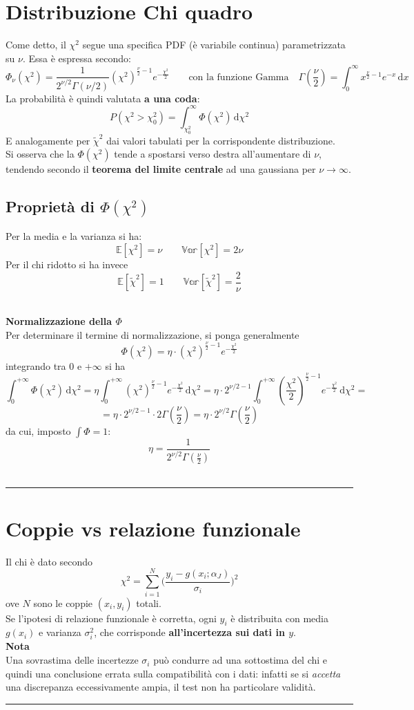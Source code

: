 \documentclass[10pt, oneside]{book}
\newcommand{\infobox}[2]{\vspace{0.5cm}~\\ \textbf{#1} \hrulefill \vspace{0.2cm}\\#2 {}\,\\\hrule \vspace{0.5cm}}
\newcommand{\integral}[4]{\int_{#1}^{#2} #3 \, \mathrm{d}#4}
\begin{document}
\section{Distribuzione Chi quadro}
Come detto, il $\chi^2$ segue una specifica PDF (è variabile continua) parametrizzata su $\nu$. Essa è espressa secondo:
\[\Phi_\nu(\chi^2) = \frac{1}{2^{\nu/2} \Gamma(\nu/2)} (\chi^2)^{\displaystyle \frac{\nu}{2} - 1} e^{\displaystyle - \frac{\chi^2}{2}} \qquad \textrm{con la funzione Gamma} \quad \Gamma(\frac{\nu}{2}) = \integral{0}{\infty}{x^{\displaystyle \frac{\nu}{2} - 1} e^{\displaystyle -x}}{x}\]
La probabilità è quindi valutata \textbf{a una coda}:
\[P( \chi^2 > \chi^2_0) = \integral{\chi^2_0}{\infty}{\Phi(\chi^2)}{\chi^2}\]
E analogamente per $\tilde{\chi}^2$ dai valori tabulati per la corrispondente distribuzione.\\
Si osserva che la $\Phi(\chi^2)$ tende a spostarsi verso destra all'aumentare di $\nu$, tendendo secondo il \textbf{teorema del limite centrale} ad una gaussiana per $\nu \rightarrow \infty$.

\subsection{Proprietà di $\Phi(\chi^2)$}
Per la media e la varianza si ha:
\[\mathbb{E}[\chi^2] = \nu \qquad \mathbb{Var}[\chi^2] = 2 \nu\]
Per il chi ridotto si ha invece
\[\mathbb{E}[\tilde{\chi}^2] = 1 \qquad \mathbb{Var}[\tilde{\chi}^2] = \frac{2}{\nu}\]

\infobox{Normalizzazione della $\Phi$}{
Per determinare il termine di normalizzazione, si ponga generalmente
\[\Phi(\chi^2) = \eta \cdot (\chi^2)^{\displaystyle \frac{\nu}{2} - 1} e^{\displaystyle - \frac{\chi^2}{2}}\]
integrando tra $0$ e $+\infty$ si ha
\[\integral{0}{+\infty}{\Phi(\chi^2)}{\chi^2} = \eta \integral{0}{+\infty}{(\chi^2)^{\displaystyle \frac{\nu}{2} - 1} e^{\displaystyle - \frac{\chi^2}{2}}}{\chi^2} = \eta \cdot 2^{\nu/2 - 1} \integral{0}{+\infty}{(\frac{\chi^2}{2})^{\displaystyle \frac{\nu}{2} - 1} e^{\displaystyle - \frac{\chi^2}{2}}}{\chi^2} =\]
\[= \eta \cdot 2^{\nu/2 - 1} \cdot 2 \Gamma(\frac{\nu}{2}) = \eta \cdot 2^{\displaystyle \nu/2} \Gamma(\frac{\nu}{2})\]
da cui, imposto $\int \Phi = 1$:
\[\eta = \frac{1}{2^{\displaystyle \nu/2} \Gamma(\frac{\nu}{2})}\]
}


\section{Coppie vs relazione funzionale}
Il chi è dato secondo
\[\chi^2 = \sum\limits_{i=1}^{N} \bigg(\frac{y_i - g(x_i; \alpha_J)}{\sigma_i}\bigg)^2\]
ove $N$ sono le coppie $(x_i, y_i)$ totali.\\
Se l'ipotesi di relazione funzionale è corretta, ogni $y_i$ è distribuita con media $g(x_i)$ e varianza $\sigma_i^2$, che corrisponde \textbf{all'incertezza sui dati in $y$}.
\infobox{Nota}{Una sovrastima delle incertezze $\sigma_i$ può condurre ad una sottostima del chi e quindi una conclusione errata sulla compatibilità con i dati: infatti se si \textit{accetta} una discrepanza eccessivamente ampia, il test non ha particolare validità.}
\end{document}
